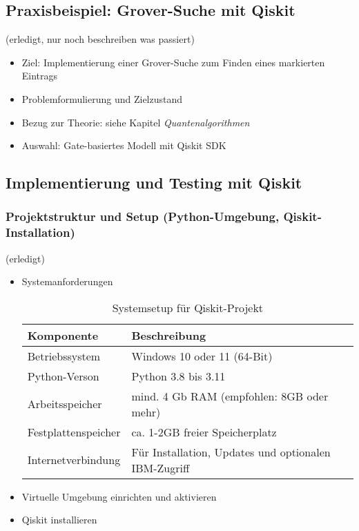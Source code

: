 \subsection{Praxisbeispiel: Grover-Suche mit Qiskit} (erledigt, nur noch beschreiben was passiert)
\begin{itemize}
    \item Ziel: Implementierung einer Grover-Suche zum Finden eines markierten Eintrags
    \item Problemformulierung und Zielzustand
    \item Bezug zur Theorie: siehe Kapitel \textit{Quantenalgorithmen}
    \item Auswahl: Gate-basiertes Modell mit Qiskit SDK
\end{itemize}

\subsection{Implementierung und Testing mit Qiskit}
\subsubsection{Projektstruktur und Setup (Python-Umgebung, Qiskit-Installation)} (erledigt)
\begin{itemize}
        \item Systemanforderungen
        \begin{table}[h]
        \centering
        \begin{tabular}{|l|l|}
        \hline
        \textbf{Komponente} & \textbf{Beschreibung} \\
        \hline
            Betriebssystem& Windows 10 oder 11 (64-Bit)\\\hline
            Python-Verson& Python 3.8 bis 3.11\\\hline
            Arbeitsspeicher& mind. 4 Gb RAM (empfohlen: 8GB oder mehr)\\
        \hline
 Festplattenspeicher &ca. 1-2GB freier Speicherplatz\\\hline
 Internetverbindung&Für Installation, Updates und optionalen IBM-Zugriff\\ \hline
        \end{tabular}
        \caption{Systemsetup für Qiskit-Projekt}
        \label{tab:setup}
\end{table}
        \item Virtuelle Umgebung einrichten und aktivieren
        \item Qiskit installieren
    \end{itemize}
